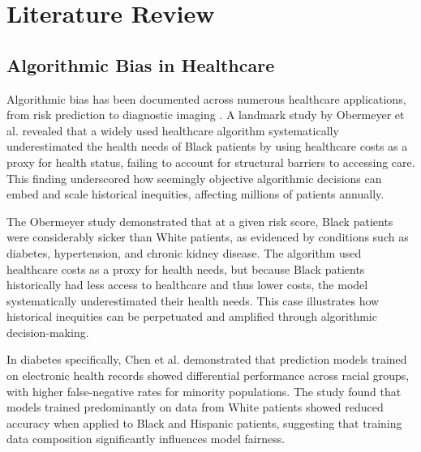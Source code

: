 
\section{Literature Review}

\subsection{Algorithmic Bias in Healthcare}

Algorithmic bias has been documented across numerous healthcare applications, 
from risk prediction to diagnostic imaging \cite{rajkomar2018}. A landmark 
study by Obermeyer et al. \cite{obermeyer2019} revealed that a widely used 
healthcare algorithm systematically underestimated the health needs of Black 
patients by using healthcare costs as a proxy for health status, failing to 
account for structural barriers to accessing care. This finding underscored 
how seemingly objective algorithmic decisions can embed and scale historical 
inequities, affecting millions of patients annually.

The Obermeyer study demonstrated that at a given risk score, Black patients 
were considerably sicker than White patients, as evidenced by conditions 
such as diabetes, hypertension, and chronic kidney disease. The algorithm 
used healthcare costs as a proxy for health needs, but because Black patients 
historically had less access to healthcare and thus lower costs, the model 
systematically underestimated their health needs. This case illustrates how 
historical inequities can be perpetuated and amplified through algorithmic 
decision-making.

In diabetes specifically, Chen et al. \cite{chen2019} demonstrated that 
prediction models trained on electronic health records showed differential 
performance across racial groups, with higher false-negative rates for 
minority populations. The study found that models trained predominantly on 
data from White patients showed reduced accuracy when applied to Black and 
Hispanic patients, suggesting that training data composition significantly 
influences model fairness.

